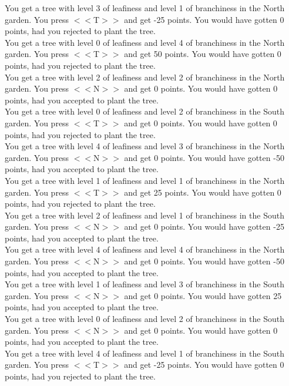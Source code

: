 \documentclass[pdflatex,sn-nature]{sn-jnl}%
\theoremstyle{thmstyleone}%
\theoremstyle{thmstyletwo}%
\theoremstyle{thmstylethree}%
\begin{document}
You get a tree with level 3 of leafiness and level 1 of branchiness in the North garden. You press $<<$T$>>$ and get -25 points. You would have gotten 0 points, had you rejected to plant the tree. $~$\\ 
You get a tree with level 0 of leafiness and level 4 of branchiness in the North garden. You press $<<$T$>>$ and get 50 points. You would have gotten 0 points, had you rejected to plant the tree. $~$\\ 
You get a tree with level 2 of leafiness and level 2 of branchiness in the North garden. You press $<<$N$>>$ and get 0 points. You would have gotten 0 points, had you accepted to plant the tree. $~$\\ 
You get a tree with level 0 of leafiness and level 2 of branchiness in the South garden. You press $<<$T$>>$ and get 0 points. You would have gotten 0 points, had you rejected to plant the tree. $~$\\ 
You get a tree with level 4 of leafiness and level 3 of branchiness in the North garden. You press $<<$N$>>$ and get 0 points. You would have gotten -50 points, had you accepted to plant the tree. $~$\\ 
You get a tree with level 1 of leafiness and level 1 of branchiness in the North garden. You press $<<$T$>>$ and get 25 points. You would have gotten 0 points, had you rejected to plant the tree. $~$\\ 
You get a tree with level 2 of leafiness and level 1 of branchiness in the South garden. You press $<<$N$>>$ and get 0 points. You would have gotten -25 points, had you accepted to plant the tree. $~$\\ 
You get a tree with level 4 of leafiness and level 4 of branchiness in the North garden. You press $<<$N$>>$ and get 0 points. You would have gotten -50 points, had you accepted to plant the tree. $~$\\ 
You get a tree with level 1 of leafiness and level 3 of branchiness in the South garden. You press $<<$N$>>$ and get 0 points. You would have gotten 25 points, had you accepted to plant the tree. $~$\\ 
You get a tree with level 0 of leafiness and level 2 of branchiness in the South garden. You press $<<$N$>>$ and get 0 points. You would have gotten 0 points, had you accepted to plant the tree. $~$\\ 
You get a tree with level 4 of leafiness and level 1 of branchiness in the South garden. You press $<<$T$>>$ and get -25 points. You would have gotten 0 points, had you rejected to plant the tree. $~$\\ 
\end{document}
